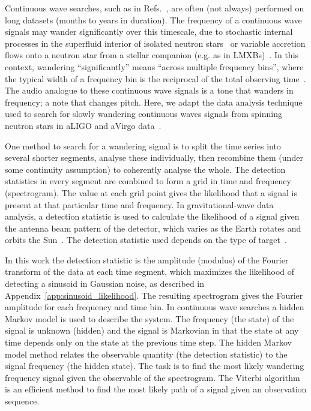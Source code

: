\documentclass[paper-main.tex]{subfiles}
\begin{document}
Continuous wave searches, such as in Refs.~\cite{SuvorovaEtAl:2016,SuvorovaEtAl:2017,SearchTwoSpecS6:2017,SunEtAlSNR:2018,JonesSun:2020}, are often (not always) performed on long datasets (months to years in duration).
The frequency of a continuous wave signals may wander significantly over this timescale, due to stochastic internal processes in the superfluid interior of isolated neutron stars~\cite{MelatosDouglassSimula:2015,Jones:2010} or variable accretion flows onto a neutron star from a stellar companion (e.g. as in LMXBs)~\cite{BildstenTB:1998}.
In this context, wandering ``significantly'' means ``across multiple frequency bins'', where the typical width of a frequency bin is the reciprocal of the total observing time~\cite{JKS:1998,ScoX1O2Viterbi:2019}.
The audio analogue to these continuous wave signals is a tone that wanders in frequency; a note that changes pitch.
Here, we adapt the data analysis technique used to search for slowly wandering continuous waves signals from spinning neutron stars in aLIGO and aVirgo data~\cite{SuvorovaEtAl:2016,SuvorovaEtAl:2017}. 


One method to search for a wandering signal is to split the time series into several shorter segments, analyse these individually, then recombine them (under some continuity assumption) to coherently analyse the whole.
The detection statistics in every segment are combined to form a grid in time and frequency (spectrogram).
The value at each grid point gives the likelihood that a signal is present at that particular time and frequency.
In gravitational-wave data analysis, a detection statistic is used to calculate the likelihood of a signal given the antenna beam pattern of the detector, which varies as the Earth rotates and orbits the Sun~\cite{JKS:1998}.
The detection statistic used depends on the type of target~\cite{JKS:1998,SuvorovaEtAl:2017}. 


In this work the detection statistic is the amplitude (modulus) of the Fourier transform of the data at each time segment, which maximizes the likelihood of detecting a sinusoid in Gaussian noise, as described in Appendix~\ref{app:sinusoid_likelihood}.
The resulting spectrogram gives the Fourier amplitude for each frequency and time bin.
In continuous wave searches a hidden Markov model is used to describe the system.
The frequency (the state) of the signal is unknown (hidden) and the signal is Markovian in that the state at any time depends only on the state at the previous time step.
The hidden Markov model method relates the observable quantity (the detection statistic) to the signal frequency (the hidden state).
The task is to find the most likely wandering frequency signal given the observable of the spectrogram.
The Viterbi algorithm~\cite{Viterbi:1967} is an efficient method to find the most likely path of a signal given an observation sequence. 
\end{document}
